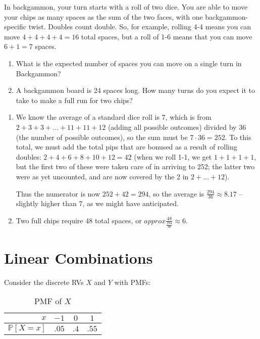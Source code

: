 \documentclass{article}
\begin{document}
In backgammon, your turn starts with a roll of two dice. You are able to move your chips as many spaces as the sum of the two faces, with one backgammon-specific twist. Doubles count double. So, for example, rolling 4-4 means you can move $4+4+4+4=16$ total spaces, but a roll of 1-6 means that you can move $6+1=7$ spaces.

\begin{enumerate}
\item What is the expected number of spaces you can move on a single turn in Backgammon?
\item A backgammon board is 24 spaces long. How many turns do you expect it to take to make a full run for two chips?
\end{enumerate}

\begin{solution}
\begin{enumerate}
\item We know the average of a standard dice roll is 7, which is from $2 + 3 + 3 + \ldots + 11 + 11 + 12$ (adding all possible outcomes) divided by 36 (the number of possible outcomes), so the sum must be $7\cdot 36 = 252$. To this total, we must add the total pips that are bonused as a result of rolling doubles: $2 + 4 + 6 + 8 + 10 + 12 = 42$ (when we roll 1-1, we get $1+1+1+1$, but the first two of these were taken care of in arriving to 252; the latter two were as yet uncounted, and are now covered by the 2 in $2+\ldots+12$).

Thus the numerator is now $252 + 42 = 294$, so the average is $\frac{294}{36}\approx 8.17$ -- slightly higher than 7, as we might have anticipated.

\item Two full chips require 48 total spaces, or $approx \frac{48}{\frac{294}{36}} \approx 6$.
\end{enumerate}
\end{solution}

\section{Linear Combinations}

Consider the discrete RVs $X$ and $Y$ with PMFs:

\begin{table}[htbp]
\centering
\begin{tabular}{r|ccc}
$x$ & $-1$ & $0$ & $1$ \\
\hline
$\mathbb{P}[X = x]$ & $.05$ & $.4$ & $.55$ \\
\end{tabular}
\caption{PMF of $X$}
\label{tbl:x_dist}
\end{table}
\end{document}
